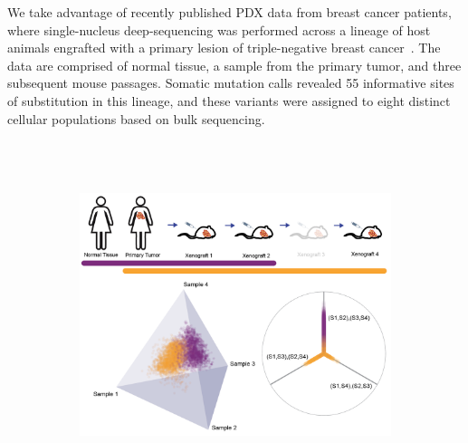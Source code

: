 \documentclass[a4paper,11pt]{article}
\begin{document}
We take advantage of recently published PDX data from breast cancer patients, where single-nucleus deep-sequencing was performed across a lineage of host animals engrafted with a primary lesion of triple-negative breast cancer~\cite{eirew2014dynamics}.
The data are comprised of normal tissue, a sample from the primary tumor, and three subsequent mouse passages.
Somatic mutation calls revealed 55 informative sites of substitution in this lineage, and these variants were assigned to eight distinct cellular populations based on bulk sequencing.

\begin{figure}
    \begin{subfigure}{\linewidth}
    \centering
    \includegraphics[height=4in]{../figures/xenograft_single_cell.png}
    \end{subfigure}


\end{figure}
\end{document}
